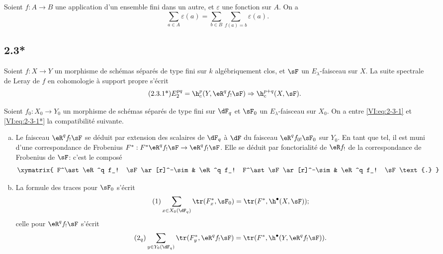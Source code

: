 Soient $f:A\to B$ une application d'un ensemble fini dans un autre, et 
$\varepsilon$ une fonction sur $A$. On a 
\begin{equation*}\tag{2.3.1}\label{VI:eq:2-3-1}
  \sum_{a\in A} \varepsilon(a) = \sum_{b\in B} \sum_{f(a)=b} \varepsilon(a) \text{.}
\end{equation*}





\subsection*{2.3*}\label{VI:2-3*}

Soient $f:X\to Y$ un morphisme de schémas séparés de type fini sur $k$ 
algébriquement clos, et $\sF$ un $E_\lambda$-faisceau sur $X$. La suite 
spectrale de Leray de $f$ en cohomologie à support propre s'écrit 
\begin{align*}\tag{2.3.1*}\label{VI:eq:2-3-1*}
  E_2^{p q} = \h_c^p(Y,\eR^q f_! \sF) \Rightarrow \h_c^{p+q}(X,\sF) \text{.}
\end{align*}

Soient $f_0:X_0 \to Y_0$ un morphisme de schémas séparés de type fini sur 
$\dF_q$ et $\sF_0$ un $E_\lambda$-faisceau sur $X_0$. On a entre 
\eqref{VI:eq:2-3-1} et \eqref{VI:eq:2-3-1*} la compatibilité suivante. 

\begin{enumerate}[a)]
  \item Le faisceau $\eR^q f_! \sF$ se déduit par extension des scalaires de 
    $\dF_q$ à $\dF$ du faisceau $\eR^q f_{0!} \sF_0$ sur $Y_0$. En tant que 
    tel, il est muni d'une correspondance de Frobenius 
    $F^\ast:F^\ast\eR^q f_! \sF \to \eR^q f_! \sF$. Elle se déduit par 
    fonctorialité de $\eR f_!$ de la correspondance de Frobenius de $\sF$: 
    c'est le composé 
    \[\xymatrix{
      F^\ast \eR^q f_! \sF \ar[r]^-\sim 
        & \eR^q f_! F^\ast \sF \ar[r]^-\sim 
        & \eR^q f_! \sF \text{.}
    }\]
  \item La formule des traces pour $\sF_0$ s'écrit 
    \begin{align*}\tag{1}\label{VI:eq:1}
      \sum_{x\in X_0(\dF_q)} \tr(F_x^\ast,\sF_0) = \tr(F^\ast,\h^\bullet(X,\sF)) \text{;}
    \end{align*}
    celle pour $\eR^q f_! \sF$ s'écrit 
    \begin{align*}\tag{2$_q$}\label{VI:eq:2_q} 
      \sum_{y\in Y_0(\dF_q)} \tr(F_y^\ast,\eR^q f_! \sF) = \tr(F^\ast, \h^\bullet(Y,\eR^q f_! \sF)) \text{.}
    \end{align*}
\end{enumerate}

